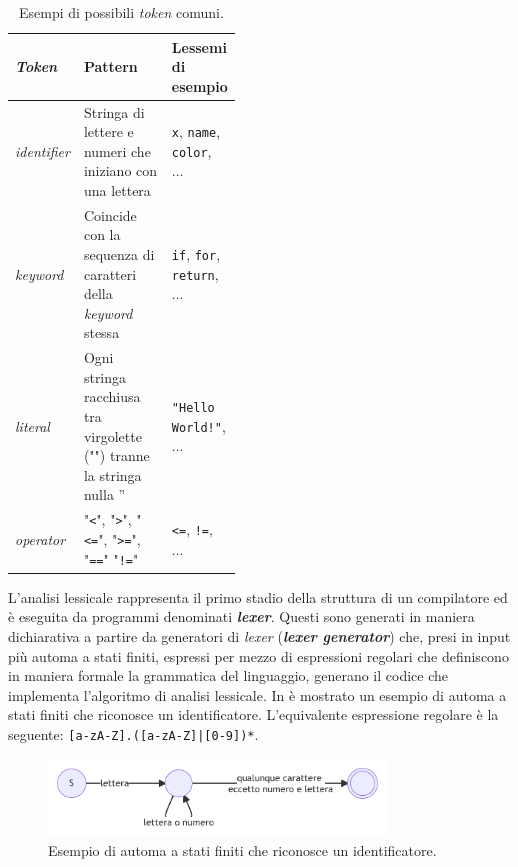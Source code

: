 \begin{table}[h]
    \centering
    \begin{tabular}{|p{0.15\linewidth}|p{0,45\linewidth}|p{0.3\linewidth}|}
        \hline
        \textbf{\textit{Token}} & \textbf{Pattern} & \textbf{Lessemi di esempio} \\ [0.5ex] 
        \hline\hline
        \textit{identifier} & Stringa di lettere e numeri che iniziano con una lettera & \texttt{x}, \texttt{name}, \texttt{color}, ... \\ 
        \hline
        \textit{keyword} & Coincide con la sequenza di caratteri della \textit{keyword} stessa & \texttt{if}, \texttt{for}, \texttt{return}, ... \\
        \hline
        \textit{literal} & Ogni stringa racchiusa tra virgolette ("") tranne la stringa nulla '' & \texttt{"Hello World!"}, ... \\
        \hline
        \textit{operator} & "\texttt{<}", "\texttt{>}", "\texttt{<=}", "\texttt{>=}", "\texttt{==}" "\texttt{!=}" & \texttt{<=}, \texttt{!=}, ... \\
        \hline
    \end{tabular}
    \caption{Esempi di possibili \textit{token} comuni.}
    \label{table:token-examples}
\end{table}

L'analisi lessicale rappresenta il primo stadio della struttura di un compilatore ed è eseguita da programmi denominati \textbf{\textit{lexer}}. 
%
Questi sono generati in maniera dichiarativa a partire da generatori di \textit{lexer} (\textbf{\textit{lexer generator}}) che, presi in input più automa a stati finiti, espressi per mezzo di espressioni regolari che definiscono in maniera formale la grammatica del linguaggio, generano il codice che implementa l'algoritmo di analisi lessicale. 
%
In  è mostrato un esempio di automa a stati finiti che riconosce un identificatore.
%
L'equivalente espressione regolare è la seguente: \texttt{[a-zA-Z].([a-zA-Z]|[0-9])*}.

\begin{figure}[h]
    \centering
    \includegraphics[width=0.8\textwidth]{resources/img/01-id-finite-automa.pdf}
    \caption{Esempio di automa a stati finiti che riconosce un identificatore.}
    \label{img:01-id-finite-automa}
\end{figure}

